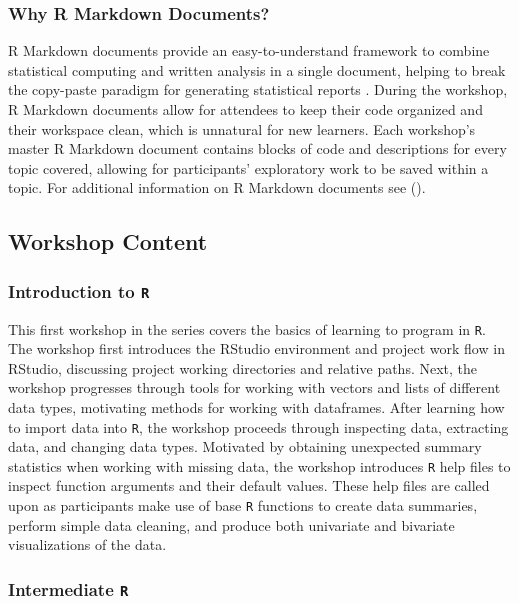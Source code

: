 \documentclass[12pt]{article}
\begin{document}
\subsubsection{Why R Markdown Documents?}

\quad R Markdown documents provide an easy-to-understand framework to combine
statistical computing and written analysis in a single document, helping to
break the copy-paste paradigm for generating statistical reports 
\citep{mine-rmarkdown}. During the workshop, R Markdown documents allow for 
attendees to keep their code organized and their workspace clean, which is
unnatural for new learners. Each workshop's master R Markdown document contains
blocks of code and descriptions for every topic covered, allowing for
participants' exploratory work to be saved within a topic. For additional
information on R Markdown documents see \citeauthor{mine-rmarkdown} 
(\citeyear{mine-rmarkdown}). 

\subsection{Workshop Content}

\subsubsection{Introduction to \texttt{R}}
\label{sec:introR}

\quad This first workshop in the series covers the basics of learning to program
in \texttt{R}. The workshop first introduces the RStudio environment and project
work flow in RStudio, discussing project working directories and relative paths.
Next, the workshop progresses through tools for working with vectors and lists 
of different data types, motivating methods for working with dataframes. After
learning how to import data into \texttt{R}, the workshop proceeds through
inspecting data, extracting data, and changing data types. Motivated by
obtaining unexpected summary statistics when working with missing data, the
workshop introduces \texttt{R} help files to inspect function arguments and
their default values. These help files are called upon as participants make use 
of base \texttt{R} functions to create data summaries, perform simple data
cleaning, and produce both univariate and bivariate visualizations of the data. 

\subsubsection{Intermediate \texttt{R}}
\label{sec:intermed}
\end{document}
